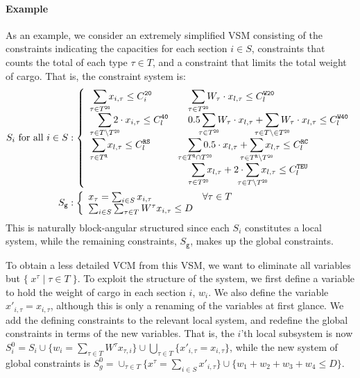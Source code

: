 \documentclass{llncs}
\newcommand{\trt}[1]{\texttt{#1}}
\newcommand{\set}[2]{\{\;{#1}\;|\;{#2}\;\}}
\begin{document}
\paragraph{Example}
As an example, we consider an extremely simplified VSM consisting of the constraints indicating the capacities for each section $i\in S$, constraints that counts the total of each type $\tau\in T$, and a constraint that limits the total weight of cargo. That is, the constraint system is:
\begin{align*}
S_i \text{ for all }i\in S&: \left\{ \begin{array}{ll}
		\smashoperator[r]{\sum_{\tau \in T^\trt{20}}} x_{i,\tau} \leq C_i^\trt{20} 									& \quad\smashoperator[r]{\sum_{\tau \in T^\trt{20}}} W_\tau\cdot x_{l,\tau} \leq C_l^\trt{W20}\\
		\smashoperator[r]{\sum_{\tau \in T\setminus T^\trt{20}}} 2\cdot x_{i,\tau} \leq C_l^\trt{40}& \quad 0.5 \smashoperator[lr]{\sum_{\tau \in T^\trt{20}}} W_\tau\cdot x_{l,\tau} + \smashoperator[lr]{\sum_{\tau \in T\setminus \in T^\trt{20}}} W_\tau\cdot x_{l,\tau} \leq C_l^\trt{W40} \\
		\smashoperator[r]{\sum_{\tau \in T^\trt{R}}} x_{l,\tau} \leq C_l^\trt{RS}										& \quad \smashoperator[lr]{\sum_{\tau \in T^\trt{R}\cap T^\trt{20}}} 0.5\cdot x_{l,\tau} + \smashoperator[lr]{\sum_{\tau \in T^\trt{R}\setminus T^\trt{20}}} x_{l,\tau} \leq C_l^\trt{RC}\\ 
		&\quad \smashoperator[r]{\sum_{\tau \in T^\trt{20}}} x_{l,\tau} + 2\cdot\smashoperator[lr]{\sum_{\tau \in T\setminus T^\trt{20}}} x_{l,\tau} \leq C_l^\trt{TEU}
\end{array}\right.\\
S_\texttt{g} &: \left\{ \begin{array}{ll} 
			x_\tau = \sum_{i\in S} x_{i,\tau} & \forall{\tau \in T}\\		
			\sum_{i\in S}\sum_{\tau\in T}W^\tau x_{i,\tau} \leq D
\end{array}\right.
\end{align*}
This is naturally block-angular structured since each $S_i$ constitutes a local system, while the remaining constraints, $S_\texttt{g}$, makes up the global constraints.  

To obtain a less detailed VCM from this VSM, we want to eliminate all variables but $\set{x^\tau}{\tau\in T}$. 
To exploit the structure of the system, we first define a variable to hold the weight of cargo in each section $i$, $w_i$. We also define the variable $x'_{i,\tau} = x_{i,\tau}$, although this is only a renaming of the variables at first glance. We add the defining constraints to the relevant local system, and redefine the global constraints in terms of the new variables. 
That is, the $i$'th local subsystem is now $S_i^0 = S_i \cup \{w_i = \sum_{\tau\in T} W^\tau x_{\tau,i}\} \cup \bigcup_{\tau\in T}\{x'_{i,\tau} = x_{i,\tau}\}$, while the new system of global constraints is $S_g^0 = \cup_{\tau\in T}\{x^\tau = \sum_{i\in S} x'_{i,\tau}\} \cup \{w_1 + w_2 + w_3 + w_4 \leq D\}$. 
\end{document}
